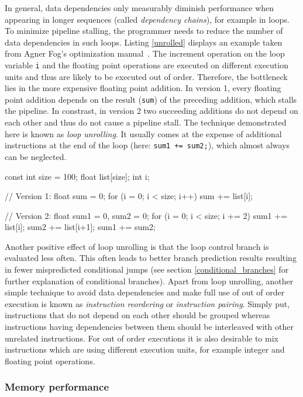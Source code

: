 In general, data dependencies only measurably diminish performance when appearing in longer sequences (called \emph{dependency chains}), for example in loops. To minimize pipeline stalling, the programmer needs to reduce the number of data dependencies in such loops. Listing \ref{unrolled} displays an example taken from Agner Fog's optimization manual~\cite[p. 103]{fog2011optimizing}. The increment operation on the loop variable \texttt{i} and the floating point operations are executed on different execution units and thus are likely to be executed out of order. Therefore, the bottleneck lies in the more expensive floating point addition. In version 1, every floating point addition depends on the result (\texttt{sum}) of the preceding addition, which stalls the pipeline. In constrast, in version 2 two succeeding additions do not depend on each other and thus do not cause a pipeline stall. The technique demonstrated here is known as \emph{loop unrolling}. It usually comes at the expense of additional instructions at the end of the loop (here: \texttt{sum1 += sum2;}), which almost always can be neglected.
\begin{code}[caption={Loop unrolling example}, label=unrolled]
const int size = 100;
float list[size]; int i;

// Version 1:
float sum = 0;
for (i = 0; i < size; i++) 
  sum += list[i];

// Version 2:
float sum1 = 0, sum2 = 0;
for (i = 0; i < size; i += 2) {
  sum1 += list[i];
  sum2 += list[i+1];
}
sum1 += sum2;
\end{code}

Another positive effect of loop unrolling is that the loop control branch is evaluated less often. This often leads to better branch prediction results resulting in fewer mispredicted conditional jumps (see section \ref{conditional_branches} for further explanation of conditional branches). Apart from loop unrolling, another simple technique to avoid data dependencies and make full use of out of order execution is known as \emph{instruction reordering} or \emph{instruction pairing}. Simply put, instructions that do not depend on each other should be grouped whereas instructions having dependencies between them should be interleaved with other unrelated instructions. For out of order executions it is also desirable to mix instructions which are using different execution units, for example integer and floating point operations. 

\subsubsection{Memory performance}
\label{memory_performance}
